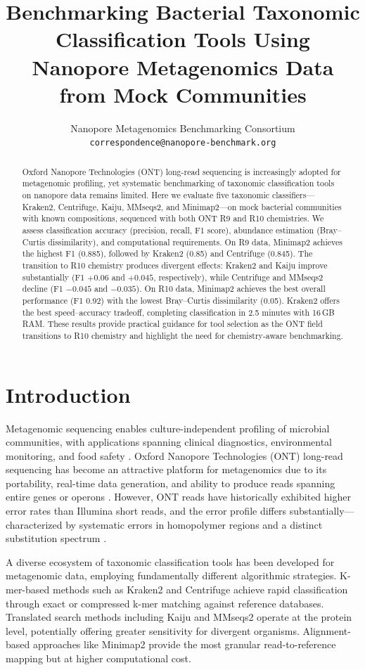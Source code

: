 \documentclass[11pt]{article}
\title{Benchmarking Bacterial Taxonomic Classification Tools Using Nanopore Metagenomics Data from Mock Communities}
\author{%
  Nanopore Metagenomics Benchmarking Consortium\\
  \texttt{correspondence@nanopore-benchmark.org}
}
\date{}
\begin{document}
\maketitle

\begin{abstract}
Oxford Nanopore Technologies (ONT) long-read sequencing is increasingly adopted for metagenomic profiling, yet systematic benchmarking of taxonomic classification tools on nanopore data remains limited. Here we evaluate five taxonomic classifiers---Kraken2, Centrifuge, Kaiju, MMseqs2, and Minimap2---on mock bacterial communities with known compositions, sequenced with both ONT R9 and R10 chemistries. We assess classification accuracy (precision, recall, F1 score), abundance estimation (Bray--Curtis dissimilarity), and computational requirements. On R9 data, Minimap2 achieves the highest F1 (0.885), followed by Kraken2 (0.85) and Centrifuge (0.845). The transition to R10 chemistry produces divergent effects: Kraken2 and Kaiju improve substantially (F1 $+0.06$ and $+0.045$, respectively), while Centrifuge and MMseqs2 decline (F1 $-0.045$ and $-0.035$). On R10 data, Minimap2 achieves the best overall performance (F1 0.92) with the lowest Bray--Curtis dissimilarity (0.05). Kraken2 offers the best speed--accuracy tradeoff, completing classification in 2.5 minutes with 16\,GB RAM. These results provide practical guidance for tool selection as the ONT field transitions to R10 chemistry and highlight the need for chemistry-aware benchmarking.
\end{abstract}

\section{Introduction}

Metagenomic sequencing enables culture-independent profiling of microbial communities, with applications spanning clinical diagnostics, environmental monitoring, and food safety \citep{quince2017}. Oxford Nanopore Technologies (ONT) long-read sequencing has become an attractive platform for metagenomics due to its portability, real-time data generation, and ability to produce reads spanning entire genes or operons \citep{loose2019}. However, ONT reads have historically exhibited higher error rates than Illumina short reads, and the error profile differs substantially---characterized by systematic errors in homopolymer regions and a distinct substitution spectrum \citep{wick2019}.

A diverse ecosystem of taxonomic classification tools has been developed for metagenomic data, employing fundamentally different algorithmic strategies. K-mer-based methods such as Kraken2 \citep{wood2019} and Centrifuge \citep{kim2016} achieve rapid classification through exact or compressed k-mer matching against reference databases. Translated search methods including Kaiju \citep{menzel2016} and MMseqs2 \citep{steinegger2017} operate at the protein level, potentially offering greater sensitivity for divergent organisms. Alignment-based approaches like Minimap2 \citep{li2018} provide the most granular read-to-reference mapping but at higher computational cost.
\end{document}

